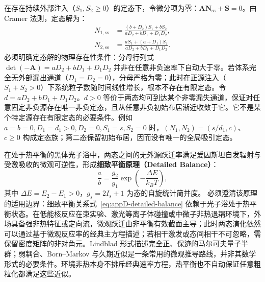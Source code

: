 在存在持续外部注入（$S_1, S_2 \ge 0$）的定态下，令微分项为零：$\mathbf{A} \mathbf{N}_{\mathrm{ss}} + \mathbf{S} = 0$。由 Cramer 法则，定态解为：
\begin{align}
N_{1, \mathrm{ss}} &= \frac{(b + D_2) S_1 + b S_2}{a D_2 + b D_1 + D_1 D_2}, \label{eq:appD-n1-ss} \\
N_{2, \mathrm{ss}} &= \frac{a S_1 + (a + D_1) S_2}{a D_2 + b D_1 + D_1 D_2}. \label{eq:appD-n2-ss}
\end{align}
必须明确定态解的物理存在性条件：分母行列式 $\det(-\mathbf{A}) = a D_2 + b D_1 + D_1 D_2$ 并非在任意非负速率下自动大于零。若体系完全无外部漏出通道（$D_1 = D_2 = 0$），分母严格为零；此时在正源注入（$S_1 + S_2 > 0$）下系统粒子数随时间线性增长，根本不存在有限定态。令 $d=aD_2+bD_1+D_1D_2$。$d>0$ 等价于两态均可到达某个非零漏失通道，保证对任意固定非负源存在唯一非负定态，且从任意非负初始布居渐近收敛于它。它不是某个特定源存在有限定态的必要条件。例如 $a=b=0,D_1=d_1>0,D_2=0,S_1=s,S_2=0$ 时，$(N_1,N_2)=(s/d_1,c)$、$c\ge0$ 构成定态族；第二态保留初始布居，因而没有唯一的全局吸引定态。


在处于热平衡的黑体光子浴中，两态之间的无外源跃迁率满足爱因斯坦自发辐射与受激吸收的微观可逆性，形成\textbf{细致平衡原理（Detailed Balance）}：
\begin{equation}\label{eq:appD-detailed-balance}
\frac{a}{b} = \frac{g_2}{g_1} \exp\left( -\frac{\Delta E}{k_B T} \right),
\end{equation}
其中 $\Delta E=E_2-E_1>0$，$g_s=2I_s+1$ 为态的自旋统计简并度。
必须澄清该原理的适用边界：细致平衡关系式~\eqref{eq:appD-detailed-balance} 依赖于光子浴处于热平衡状态。在低能核反应在束实验、激光等离子体碰撞或中微子非热退耦环境下，外场具备强非热特征或定向流，微观跃迁由非平衡有效截面主导；此时两态演化依然可以通过基于微观反应率的经典主方程描述；若相干激发或态间相干不可忽略，需保留密度矩阵的非对角元。Lindblad 形式描述完全正、保迹的马尔可夫量子半群；弱耦合、Born--Markov 与久期近似是一条常用的微观推导路线，并非其数学形式的必要条件。环境非热本身不排斥经典速率方程，热平衡也不自动保证任意粗粒化都满足这些近似。
